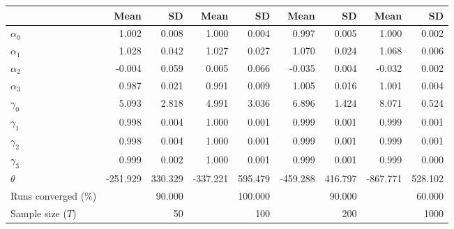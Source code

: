 
\begin{tabular}[t]{lrrrrrrrr}
\toprule
  & Mean & SD & Mean  & SD  & Mean   & SD   & Mean    & SD   \\
\midrule
$\alpha_{0}$ & 1.002 & 0.008 & 1.000 & 0.004 & 0.997 & 0.005 & 1.000 & 0.002\\
$\alpha_{1}$ & 1.028 & 0.042 & 1.027 & 0.027 & 1.070 & 0.024 & 1.068 & 0.006\\
$\alpha_{2}$ & -0.004 & 0.059 & 0.005 & 0.066 & -0.035 & 0.004 & -0.032 & 0.002\\
$\alpha_{3}$ & 0.987 & 0.021 & 0.991 & 0.009 & 1.005 & 0.016 & 1.001 & 0.004\\
$\gamma_{0}$ & 5.093 & 2.818 & 4.991 & 3.036 & 6.896 & 1.424 & 8.071 & 0.524\\
$\gamma_{1}$ & 0.998 & 0.004 & 1.000 & 0.001 & 0.999 & 0.001 & 0.999 & 0.001\\
$\gamma_{2}$ & 0.998 & 0.004 & 1.000 & 0.001 & 0.999 & 0.001 & 0.999 & 0.001\\
$\gamma_{3}$ & 0.999 & 0.002 & 1.000 & 0.001 & 0.999 & 0.001 & 0.999 & 0.000\\
$\theta$ & -251.929 & 330.329 & -337.221 & 595.479 & -459.288 & 416.797 & -867.771 & 528.102\\
Runs converged (\%) &  & 90.000 &  & 100.000 &  & 90.000 &  & 60.000\\
Sample size ($T$) &  & 50 &  & 100 &  & 200 &  & 1000\\
\bottomrule
\end{tabular}
